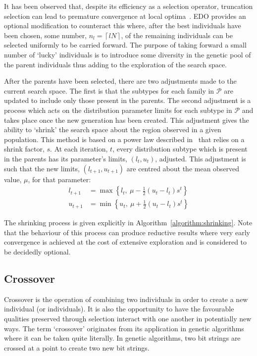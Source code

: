 It has been observed that, despite its efficiency as a selection operator,
truncation selection can lead to premature convergence at local
optima~\cite{Jebari2013,Motoki2002}. EDO provides an optional modification to
counteract this where, after the best individuals have been chosen, some number,
\(n_l = \left\lceil l N\right\rceil\), of the remaining individuals can be
selected uniformly to be carried forward. The purpose of taking forward a small
number of `lucky' individuals is to introduce some diversity in the genetic pool
of the parent individuals thus adding to the exploration of the search space.

After the parents have been selected, there are two adjustments made to the
current search space. The first is that the subtypes for each family in
\(\mathcal{P}\) are updated to include only those present in the parents. The
second adjustment is a process which acts on the distribution parameter limits
for each subtype in \(\mathcal{P}\) and takes place once the new generation has
been created. This adjustment gives the ability to `shrink' the search space
about the region observed in a given population. This method is based on a power
law described in~\cite{Amirjanov2016} that relies on a shrink factor, \(s\). At
each iteration, \(t\), every distribution subtype which is present in the
parents has its parameter's limits, \(\left(l_t, u_t\right)\), adjusted. This
adjustment is such that the new limits, \(\left(l_{t+1}, u_{t+1}\right)\) are
centred about the mean observed value, \(\mu\), for that parameter:
\begin{align}
    \label{eq:shrinking_lower}
    l_{t+1}&= \max \left\{l_t, \ \mu - \frac{1}{2} (u_t - l_t) s^t\right\}\\
    \label{eq:shrinking_upper}
    u_{t+1}&= \min \left\{u_t, \ \mu + \frac{1}{2} (u_t - l_t) s^t\right\}
\end{align}

The shrinking process is given explicitly in
Algorithm~\ref{algorithm:shrinking}. Note that the behaviour of this process can
produce reductive results where very early convergence is achieved at the cost
of extensive exploration and is considered to be decidedly optional.



\subsection{Crossover}

Crossover is the operation of combining two individuals in order to create a new
individual (or individuals). It is also the opportunity to have the favourable
qualities preserved through selection interact with one another in potentially
new ways. The term `crossover' originates from its application in genetic
algorithms where it can be taken quite literally. In genetic algorithms, two bit
strings are crossed at a point to create two new bit strings.

